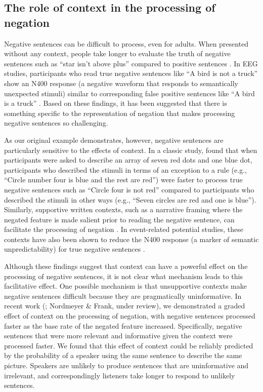 \documentclass[man, noapacite]{apa2}
\begin{document}
\subsection{The role of context in the processing of negation}

Negative sentences can be difficult to process, even for adults. When presented without any context, people take longer to evaluate the truth of negative sentences such as ``star isn't above plus'' compared to positive sentences \cite{hclark1972, carpenter1975, just1971, just1976}. In EEG studies, participants who read true negative sentences like ``A bird is not a truck'' show an N400 response (a negative waveform that responds to semantically unexpected stimuli) similar to corresponding false positive sentences like ``A bird is a truck'' \cite{fischler1983, ludtke2008}. Based on these findings, it has been suggested that there is something specific to the representation of negation that makes processing negative sentences so challenging.

As our original example demonstrates, however, negative sentences are particularly sensitive to the effects of context.  In a classic study,  found that when participants were asked to describe an array of seven red dots and one blue dot, participants who described the stimuli in terms of an exception to a rule (e.g., ``Circle number four is blue and the rest are red'') were faster to process true negative sentences such as ``Circle four is not red'' compared to participants who described the stimuli in other ways (e.g., ``Seven circles are red and one is blue''). Similarly, supportive written contexts, such as a narrative framing where the negated feature is made salient prior to reading the negative sentence, can facilitate the processing of negation \cite{glenberg1999, ludtke2006, nieuwland2008, dale2011}. In event-related potential studies, these contexts have also been shown to reduce the N400 response (a marker of semantic unpredictability) for true negative sentences \cite{nieuwland2008}.

Although these findings suggest that context can have a powerful effect on the processing of negative sentences, it is not clear what mechanism leads to this facilitative effect. One possible mechanism is that unsupportive contexts make negative sentences difficult because they are pragmatically uninformative. In recent work (; Nordmeyer \& Frank, under review), we demonstrated a graded effect of context on the processing of negation, with negative sentences processed faster as the base rate of the negated feature increased. Specifically, negative sentences that were more relevant and informative given the context were processed faster. We found that this effect of context could be reliably predicted by the probability of a speaker using the same sentence to describe the same picture. Speakers are unlikely to produce sentences that are uninformative and irrelevant, and correspondingly listeners take longer to respond to unlikely sentences.
\end{document}
